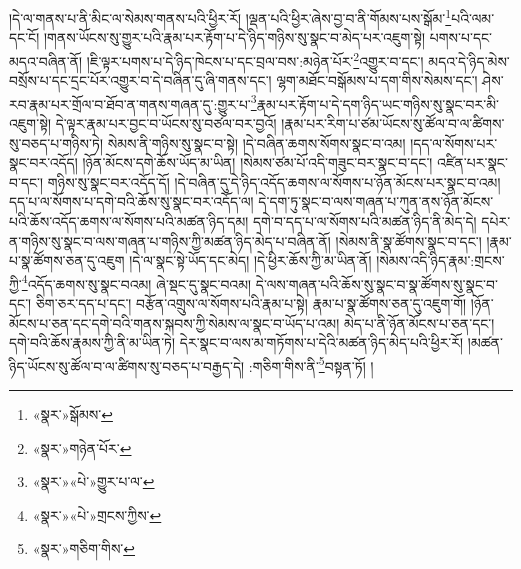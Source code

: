 །དེ་ལ་གནས་པ་ནི་མིང་ལ་སེམས་གནས་པའི་ཕྱིར་རོ། །ལྡན་པའི་ཕྱིར་ཞེས་བྱ་བ་ནི་གོམས་པས་སྒོམ་\footnote{«སྣར་»སྒོམས་}པའི་ལམ་དང་ངོ། །གནས་ཡོངས་སུ་གྱུར་པའི་རྣམ་པར་རྟོག་པ་དེ་ཉིད་གཉིས་སུ་སྣང་བ་མེད་པར་འཇུག་སྟེ། པགས་པ་དང་མདའ་བཞིན་ནོ། །ཇི་ལྟར་པགས་པ་དེ་ཉིད་ཁེངས་པ་དང་བྲལ་བས་:མཉེན་པོར་\footnote{«སྣར་»གཉེན་པོར་}འགྱུར་བ་དང་། མདའ་དེ་ཉིད་མེས་བསྲོས་པ་དང་དྲང་པོར་འགྱུར་བ་དེ་བཞིན་དུ་ཞི་གནས་དང་། ལྷག་མཐོང་བསྒོམས་པ་དག་གིས་སེམས་དང་། ཤེས་རབ་རྣམ་པར་གྲོལ་བ་ཐོབ་ན་གནས་གཞན་དུ་:གྱུར་པ་\footnote{«སྣར་»«པེ་»གྱུར་པ་ལ་}རྣམ་པར་རྟོག་པ་དེ་དག་ཉིད་ཡང་གཉིས་སུ་སྣང་བར་མི་འཇུག་སྟེ། དེ་ལྟར་རྣམ་པར་བྱང་བ་ཡོངས་སུ་བཙལ་བར་བྱའོ། །རྣམ་པར་རིག་པ་ཙམ་ཡོངས་སུ་ཚོལ་བ་ལ་ཚིགས་སུ་བཅད་པ་གཉིས་ཏེ། སེམས་ནི་གཉིས་སུ་སྣང་བ་སྟེ། །དེ་བཞིན་ཆགས་སོགས་སྣང་བ་འམ། །དད་ལ་སོགས་པར་སྣང་བར་འདོད། །ཉོན་མོངས་དགེ་ཆོས་ཡོད་མ་ཡིན། །སེམས་ཙམ་པོ་འདི་གཟུང་བར་སྣང་བ་དང་། འཛིན་པར་སྣང་བ་དང་། གཉིས་སུ་སྣང་བར་འདོད་དོ། །དེ་བཞིན་དུ་དེ་ཉིད་འདོད་ཆགས་ལ་སོགས་པ་ཉོན་མོངས་པར་སྣང་བ་འམ། དད་པ་ལ་སོགས་པ་དགེ་བའི་ཆོས་སུ་སྣང་བར་འདོད་ལ། དེ་དག་ཏུ་སྣང་བ་ལས་གཞན་པ་ཀུན་ནས་ཉོན་མོངས་པའི་ཆོས་འདོད་ཆགས་ལ་སོགས་པའི་མཚན་ཉིད་དམ། དགེ་བ་དད་པ་ལ་སོགས་པའི་མཚན་ཉིད་ནི་མེད་དེ། དཔེར་ན་གཉིས་སུ་སྣང་བ་ལས་གཞན་པ་གཉིས་ཀྱི་མཚན་ཉིད་མེད་པ་བཞིན་ནོ། །སེམས་ནི་སྣ་ཚོགས་སྣང་བ་དང་། །རྣམ་པ་སྣ་ཚོགས་ཅན་དུ་འཇུག །དེ་ལ་སྣང་སྟེ་ཡོད་དང་མེད། །དེ་ཕྱིར་ཆོས་ཀྱི་མ་ཡིན་ནོ། །སེམས་འདི་ཉིད་རྣམ་:གྲངས་ཀྱི་\footnote{«སྣར་»«པེ་»གྲངས་ཀྱིས་}འདོད་ཆགས་སུ་སྣང་བའམ། ཞེ་སྡང་དུ་སྣང་བའམ། དེ་ལས་གཞན་པའི་ཆོས་སུ་སྣང་བ་སྣ་ཚོགས་སུ་སྣང་བ་དང་། ཅིག་ཅར་དད་པ་དང་། བརྩོན་འགྲུས་ལ་སོགས་པའི་རྣམ་པ་སྟེ། རྣམ་པ་སྣ་ཚོགས་ཅན་དུ་འཇུག་གོ། །ཉོན་མོངས་པ་ཅན་དང་དགེ་བའི་གནས་སྐབས་ཀྱི་སེམས་ལ་སྣང་བ་ཡོད་པ་འམ། མེད་པ་ནི་ཉོན་མོངས་པ་ཅན་དང་། དགེ་བའི་ཆོས་རྣམས་ཀྱི་ནི་མ་ཡིན་ཏེ། དེར་སྣང་བ་ལས་མ་གཏོགས་པ་དེའི་མཚན་ཉིད་མེད་པའི་ཕྱིར་རོ། །མཚན་ཉིད་ཡོངས་སུ་ཚོལ་བ་ལ་ཚིགས་སུ་བཅད་པ་བརྒྱད་དེ། :གཅིག་གིས་ནི་\footnote{«སྣར་»གཅིག་གིས་}བསྟན་ཏོ། །
